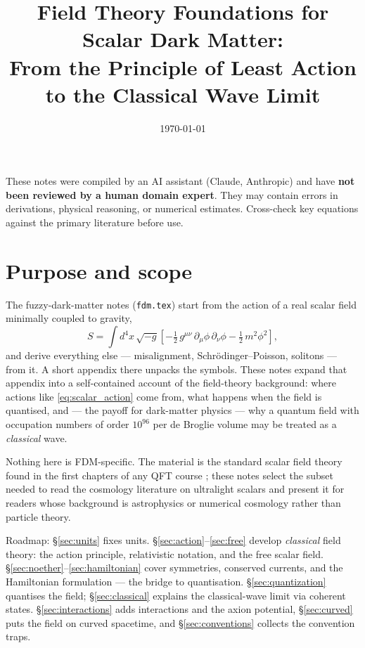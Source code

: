 \documentclass[12pt]{article}
\title{Field Theory Foundations for Scalar Dark Matter:\\
       From the Principle of Least Action to the Classical Wave Limit}
\author{}
\date{\today}
\begin{document}
\maketitle
\tableofcontents
\newpage

\begin{tcolorbox}[colback=yellow!10!white, colframe=orange!75!black,
                  title={\bfseries Disclaimer}]
These notes were compiled by an AI assistant (Claude, Anthropic) and have
\textbf{not been reviewed by a human domain expert}.  They may contain
errors in derivations, physical reasoning, or numerical estimates.
Cross-check key equations against the primary literature before use.
\end{tcolorbox}
\vspace{0.5em}

\section{Purpose and scope}
\label{sec:intro}

The fuzzy-dark-matter notes (\texttt{fdm.tex}) start from the action of
a real scalar field minimally coupled to gravity,
%
\begin{equation}
  S = \int d^4x\,\sqrt{-g}\left[
       -\tfrac{1}{2}\,g^{\mu\nu}\,\partial_\mu\phi\,\partial_\nu\phi
       -\tfrac{1}{2}\,m^2\phi^2
      \right],
  \label{eq:scalar_action}
\end{equation}
%
and derive everything else --- misalignment, Schr\"odinger--Poisson,
solitons --- from it.  A short appendix there unpacks the symbols.
These notes expand that appendix into a self-contained account of the
field-theory background: where actions like \eqref{eq:scalar_action}
come from, what happens when the field is quantised, and --- the payoff
for dark-matter physics --- why a quantum field with occupation numbers
of order $10^{96}$ per de Broglie volume may be treated as a
\emph{classical} wave.

Nothing here is FDM-specific.  The material is the standard scalar
field theory found in the first chapters of any QFT course
\citep{Tong2007, Coleman2011, Srednicki2007, PeskinSchroeder1995};
these notes select the subset needed to read the cosmology literature
on ultralight scalars \citep{Hui2017, Marsh2016} and present it for
readers whose background is astrophysics or numerical cosmology rather
than particle theory.

Roadmap: \S\ref{sec:units} fixes units.
\S\ref{sec:action}--\ref{sec:free} develop \emph{classical} field
theory: the action principle, relativistic notation, and the free
scalar field.  \S\ref{sec:noether}--\ref{sec:hamiltonian} cover
symmetries, conserved currents, and the Hamiltonian formulation ---
the bridge to quantisation.  \S\ref{sec:quantization} quantises the
field; \S\ref{sec:classical} explains the classical-wave limit via
coherent states.  \S\ref{sec:interactions} adds interactions and the
axion potential, \S\ref{sec:curved} puts the field on curved
spacetime, and \S\ref{sec:conventions} collects the convention traps.
\end{document}
